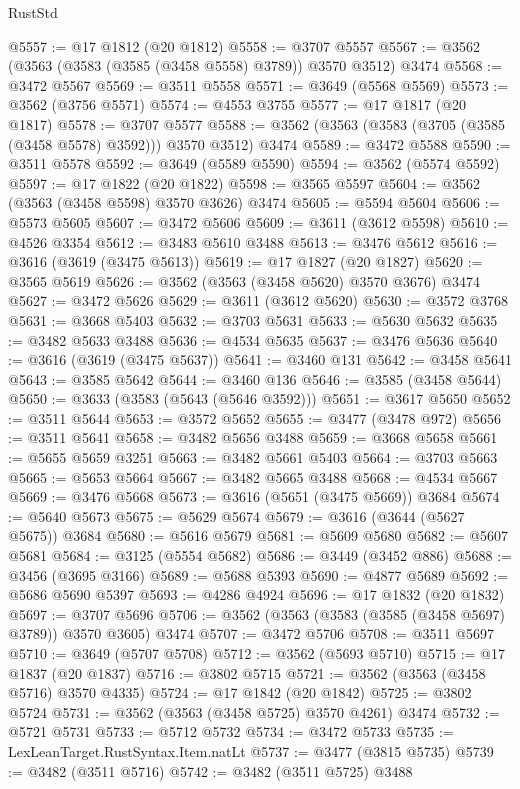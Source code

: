 \begin{lexlean}{RustStd}
\begin{coremodule}
{\begin{coremodule}
{{{{{{{{{{{{{{{{{{{{{{{{{{{{{{{{{{{{{{{{{{{{{@5557 := @17 @1812 (@20 @1812)
@5558 := @3707 @5557
@5567 := @3562 (@3563 (@3583 (@3585 (@3458 @5558) @3789)) @3570 @3512) @3474
@5568 := @3472 @5567
@5569 := @3511 @5558
@5571 := @3649 (@5568 @5569)
@5573 := @3562 (@3756 @5571)
@5574 := @4553 @3755
@5577 := @17 @1817 (@20 @1817)
@5578 := @3707 @5577
@5588 := @3562 (@3563 (@3583 (@3705 (@3585 (@3458 @5578) @3592))) @3570 @3512) @3474
@5589 := @3472 @5588
@5590 := @3511 @5578
@5592 := @3649 (@5589 @5590)
@5594 := @3562 (@5574 @5592)
@5597 := @17 @1822 (@20 @1822)
@5598 := @3565 @5597
@5604 := @3562 (@3563 (@3458 @5598) @3570 @3626) @3474
@5605 := @5594 @5604
@5606 := @5573 @5605
@5607 := @3472 @5606
@5609 := @3611 (@3612 @5598)
@5610 := @4526 @3354
@5612 := @3483 @5610 @3488
@5613 := @3476 @5612
@5616 := @3616 (@3619 (@3475 @5613))
@5619 := @17 @1827 (@20 @1827)
@5620 := @3565 @5619
@5626 := @3562 (@3563 (@3458 @5620) @3570 @3676) @3474
@5627 := @3472 @5626
@5629 := @3611 (@3612 @5620)
@5630 := @3572 @3768
@5631 := @3668 @5403
@5632 := @3703 @5631
@5633 := @5630 @5632
@5635 := @3482 @5633 @3488
@5636 := @4534 @5635
@5637 := @3476 @5636
@5640 := @3616 (@3619 (@3475 @5637))
@5641 := @3460 @131
@5642 := @3458 @5641
@5643 := @3585 @5642
@5644 := @3460 @136
@5646 := @3585 (@3458 @5644)
@5650 := @3633 (@3583 (@5643 (@5646 @3592)))
@5651 := @3617 @5650
@5652 := @3511 @5644
@5653 := @3572 @5652
@5655 := @3477 (@3478 @972)
@5656 := @3511 @5641
@5658 := @3482 @5656 @3488
@5659 := @3668 @5658
@5661 := @5655 @5659 @3251
@5663 := @3482 @5661 @5403
@5664 := @3703 @5663
@5665 := @5653 @5664
@5667 := @3482 @5665 @3488
@5668 := @4534 @5667
@5669 := @3476 @5668
@5673 := @3616 (@5651 (@3475 @5669)) @3684
@5674 := @5640 @5673
@5675 := @5629 @5674
@5679 := @3616 (@3644 (@5627 @5675)) @3684
@5680 := @5616 @5679
@5681 := @5609 @5680
@5682 := @5607 @5681
@5684 := @3125 (@5554 @5682)
@5686 := @3449 (@3452 @886)
@5688 := @3456 (@3695 @3166)
@5689 := @5688 @5393
@5690 := @4877 @5689
@5692 := @5686 @5690 @5397
@5693 := @4286 @4924
@5696 := @17 @1832 (@20 @1832)
@5697 := @3707 @5696
@5706 := @3562 (@3563 (@3583 (@3585 (@3458 @5697) @3789)) @3570 @3605) @3474
@5707 := @3472 @5706
@5708 := @3511 @5697
@5710 := @3649 (@5707 @5708)
@5712 := @3562 (@5693 @5710)
@5715 := @17 @1837 (@20 @1837)
@5716 := @3802 @5715
@5721 := @3562 (@3563 (@3458 @5716) @3570 @4335)
@5724 := @17 @1842 (@20 @1842)
@5725 := @3802 @5724
@5731 := @3562 (@3563 (@3458 @5725) @3570 @4261) @3474
@5732 := @5721 @5731
@5733 := @5712 @5732
@5734 := @3472 @5733
@5735 := LexLeanTarget.RustSyntax.Item.natLt
@5737 := @3477 (@3815 @5735)
@5739 := @3482 (@3511 @5716)
@5742 := @3482 (@3511 @5725) @3488
}}}}}}}}}}}}}}}}}}}}}}}}}}}}}}}}}}}}}}}}}}}}}
\end{coremodule}}
\end{coremodule}
\end{lexlean}
